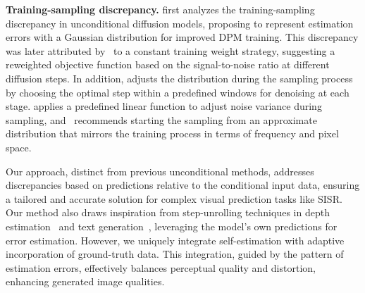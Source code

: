 \textbf{Training-sampling discrepancy.} 
\cite{ning2023input} first analyzes the training-sampling discrepancy in unconditional diffusion models, proposing to represent estimation errors with a Gaussian distribution for improved DPM training.  This discrepancy was later attributed by~\cite{yu2023debias} to a constant training weight strategy, suggesting a reweighted objective function based on the signal-to-noise ratio at different diffusion steps.  In addition, \cite{li2023alleviating} adjusts the distribution during the sampling process by choosing the optimal step within a predefined windows for denoising at each stage. \cite{ning2023elucidating} applies a predefined linear function to adjust noise variance during sampling, and~\cite{everaert2023exploiting} recommends starting the sampling from an approximate distribution that mirrors the training process in terms of frequency and pixel space.

Our approach, distinct from previous unconditional methods, addresses discrepancies based on predictions relative to the conditional input data, ensuring a tailored and accurate solution for complex visual prediction tasks like SISR. Our method also draws inspiration from step-unrolling techniques in depth estimation~\cite{saxena2023monocular, ji2023ddp} and text generation~\cite{savinov2022stepunrolled}, leveraging the model's own predictions for error estimation. However, we uniquely integrate self-estimation with adaptive incorporation of ground-truth data. This integration, guided by the pattern of estimation errors, effectively balances perceptual quality and distortion, enhancing generated image qualities.
